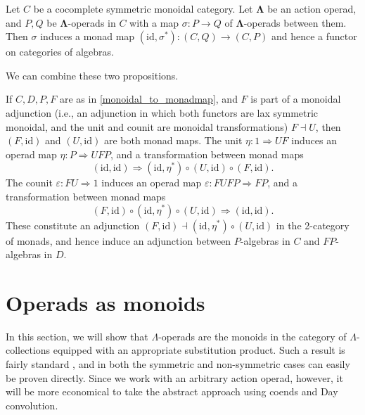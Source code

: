 \documentclass{amsbook} %
\newcommand{\id}{\textrm{id}}
\newcommand{\ML}{\mathbf{\Lambda}}
\newcommand{\epz}{\varepsilon}
\numberwithin{section}{chapter}
\begin{document}
\begin{prop}\label{opmap_to_monadmap}
Let $C$ be a cocomplete symmetric monoidal category. Let $\ML$ be an action operad, and $P,Q$ be  $\ML$-operads in $C$ with a map $\sigma: P \to Q$ of $\ML$-operads between them. Then $\sigma$ induces a monad map $(\id, \sigma^*):(C,Q) \to (C,P)$ and hence a functor on categories of algebras.
\end{prop}

We can combine these two propositions.

\begin{cor}\label{monoidaladj_cor}
If $C, D, P, F$ are as in \cref{monoidal_to_monadmap}, and $F$ is part of a monoidal adjunction (i.e., an adjunction in which both functors are lax symmetric monoidal, and the unit and counit are monoidal transformations) $F \dashv U$, then $(F, \id)$ and $(U, \id)$ are both monad maps. The unit $\eta:1 \Rightarrow UF$ induces an operad map $\eta:P \Rightarrow UFP$, and a transformation between monad maps
\[
(\id, \id) \Rightarrow (\id, \eta^*) \circ (U, \id) \circ (F, \id).
\]
The counit $\epz:FU \Rightarrow 1$ induces an operad map $\epz:FUFP \Rightarrow FP$, and a transformation between monad maps
\[
 (F, \id) \circ (\id, \eta^*) \circ (U,\id) \Rightarrow (\id, \id).
\]
These constitute an adjunction $(F,\id) \dashv (\id, \eta^*) \circ (U, \id)$ in the 2-category of monads, and hence induce an adjunction between $P$-algebras in $C$ and $FP$-algebras in $D$.
\end{cor}

\section{Operads as monoids}\label{sec:opasmon}

In this section, we will show that $\Lambda$-operads are the monoids in the category of $\Lambda$-collections equipped with an appropriate substitution product.  Such a result is fairly standard \cite{mss-op}, and in both the symmetric and non-symmetric cases can easily be proven directly.  Since we work with an arbitrary action operad, however, it will be more economical to take the abstract approach using coends and Day convolution.
\end{document}
